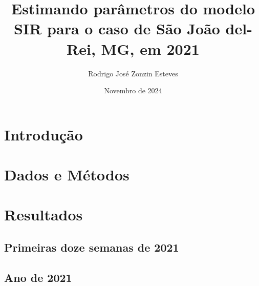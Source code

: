 \documentclass[]{article}
\title{Estimando parâmetros do modelo SIR para o caso de São João del-Rei, MG, em 2021}
\author{Rodrigo José Zonzin Esteves}
\date{Novembro de 2024}
\begin{document}
\maketitle

\section{Introdução}
\section{Dados e Métodos}
\section{Resultados}
\subsection{Primeiras doze semanas de 2021}

\subsection{Ano de 2021}
\end{document}
